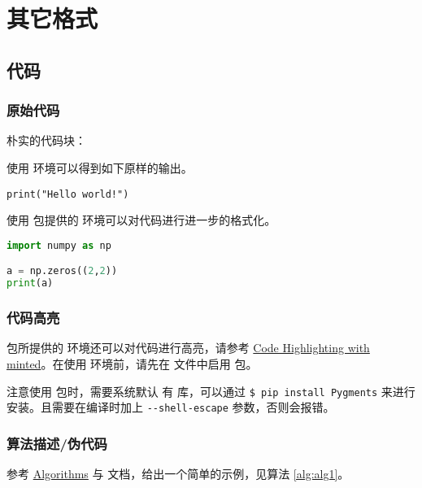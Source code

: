 
\chapter{其它格式}
\section{代码}
\subsection{原始代码}
朴实的代码块：

使用  环境可以得到如下原样的输出。
\begin{verbatim}
print("Hello world!")
\end{verbatim}

使用  包提供的  环境可以对代码进行进一步的格式化。
\begin{lstlisting}[language=Python,frame=single]
import numpy as np

a = np.zeros((2,2))
print(a)
\end{lstlisting}

\subsection{代码高亮}
 包所提供的  环境还可以对代码进行高亮，请参考 \href{https://www.overleaf.com/learn/latex/Code_Highlighting_with_minted}{Code Highlighting with minted}。在使用  环境前，请先在 文件中启用  包。

注意使用  包时，需要系统默认  有  库，可以通过 \verb|$ pip install Pygments| 来进行安装。且需要在编译时加上 \verb|--shell-escape| 参数，否则会报错。



\subsection{算法描述/伪代码}
参考 \href{https://en.wikibooks.org/wiki/LaTeX/Algorithms}{Algorithms} 与  文档，给出一个简单的示例，见算法 \ref{alg:alg1}。


